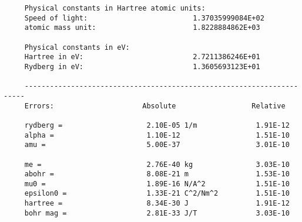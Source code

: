 \documentclass[12pt,a4paper]{article}
\begin{document}
\begin{verbatim}
     Physical constants in Hartree atomic units:
     Speed of light:                         1.37035999084E+02
     atomic mass unit:                       1.8228884862E+03

     Physical constants in eV:
     Hartree in eV:                          2.7211386246E+01
     Rydberg in eV:                          1.3605693123E+01

     ----------------------------------------------------------------------
     Errors:                     Absolute                  Relative

     rydberg =                    2.10E-05 1/m              1.91E-12
     alpha =                      1.10E-12                  1.51E-10
     amu =                        5.00E-37                  3.01E-10

     me =                         2.76E-40 kg               3.03E-10
     abohr =                      8.08E-21 m                1.53E-10
     mu0 =                        1.89E-16 N/A^2            1.51E-10
     epsilon0 =                   1.33E-21 C^2/Nm^2         1.51E-10
     hartree =                    8.34E-30 J                1.91E-12
     bohr mag =                   2.81E-33 J/T              3.03E-10


\end{verbatim}
\end{document}
